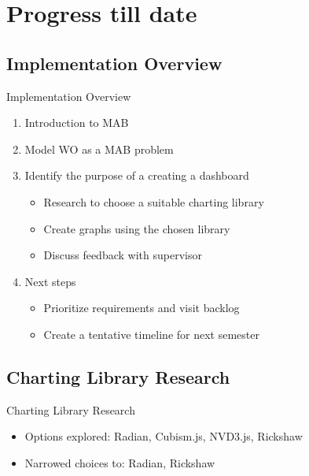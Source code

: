 \documentclass{beamer}
\begin{document}
\section{Progress till date}

\subsection{Implementation Overview}
\begin{frame}{Implementation Overview}
\begin{enumerate}
	\item Introduction to MAB
	\item Model WO as a MAB problem
	\item Identify the purpose of a creating a dashboard 
	\begin{itemize}
		\item Research to choose a suitable charting library
		\item Create graphs using the chosen library
		\item Discuss feedback with supervisor
	\end{itemize}
	\item Next steps
	\begin{itemize}
		\item Prioritize requirements and visit backlog
		\item Create a tentative timeline for next semester
	\end{itemize}
\end{enumerate}
\end{frame}

\subsection{Charting Library Research}
\begin{frame}{Charting Library Research}
	\begin{itemize}
		\item Options explored: Radian, Cubism.js, NVD3.js, Rickshaw
		\item Narrowed choices to: Radian, Rickshaw
	\end{itemize}
\end{frame}
\end{document}
